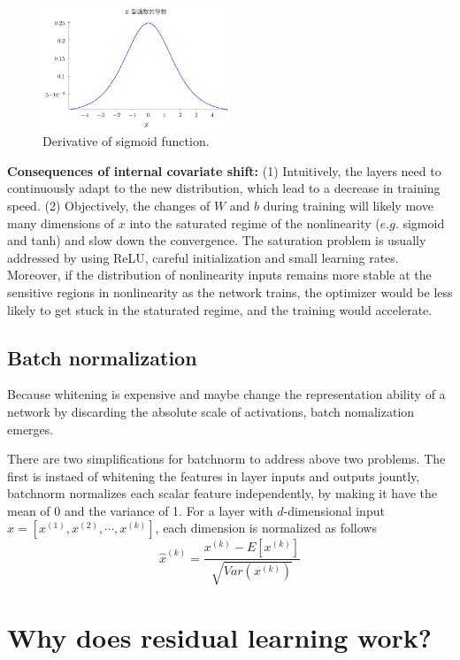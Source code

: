 \documentclass[10pt,onecolumn]{book}
\begin{document}
\begin{figure}[h]
\centering
\includegraphics[width=0.5\textwidth]{figures/sigmoid.png}
\caption{Derivative of sigmoid function.}
\end{figure}


\textbf{Consequences of internal covariate shift: }(1) Intuitively, the layers need to continuously adapt to the new distribution, which lead to a decrease in training speed. (2) Objectively, the changes of $W$ and $b$ during training will likely move many dimensions of $x$ into the saturated regime of the nonlinearity ($e.g.$ sigmoid and tanh) and slow down the convergence. The saturation problem is usually addressed by using ReLU, careful initialization and small learning rates. Moreover, if the distribution of nonlinearity inputs remains more stable at the sensitive regions in nonlinearity as the network trains, the optimizer would be less likely to get stuck in the staturated regime, and the training would accelerate.


\subsection{Batch normalization}
Because whitening is expensive and maybe change the representation ability of a network by discarding the absolute scale of activations, batch nomalization emerges.

There are two simplifications for batchnorm to address above two problems. The first is instaed of whitening the features in layer inputs and outputs jountly, batchnorm normalizes each scalar feature independently, by making it have the mean of 0 and the variance of 1. For a layer with $d$-dimensional input $x=[x^(1), x^(2), \cdots, x^(k)]$,  each dimension is normalized as follows 
\begin{equation}
\hat{x}^{(k)} = \frac{x^{(k)} - E[x^{(k)}]}{\sqrt{Var(x^{(k)})}}
\end{equation}


\section{Why does residual learning work?}
\end{document}
